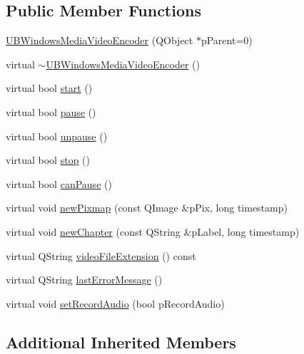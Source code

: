 \subsection*{Public Member Functions}
\begin{DoxyCompactItemize}
\item 
\hyperlink{class_u_b_windows_media_video_encoder_a6902002f07e574ef46f2e975cf75eac8}{U\-B\-Windows\-Media\-Video\-Encoder} (Q\-Object $\ast$p\-Parent=0)
\item 
virtual \hyperlink{class_u_b_windows_media_video_encoder_ad6213726d5404dbcfa03924a40ee7d8e}{$\sim$\-U\-B\-Windows\-Media\-Video\-Encoder} ()
\item 
virtual bool \hyperlink{class_u_b_windows_media_video_encoder_a88826be28b76bc7917daac0c8b077037}{start} ()
\item 
virtual bool \hyperlink{class_u_b_windows_media_video_encoder_a58feb0ad63b6e980b77e5a7cd9392f7c}{pause} ()
\item 
virtual bool \hyperlink{class_u_b_windows_media_video_encoder_ae4d2d6fbc01e62141279fd17f8f89e76}{unpause} ()
\item 
virtual bool \hyperlink{class_u_b_windows_media_video_encoder_a9f665f07f31a18c712653890abc7c6e6}{stop} ()
\item 
virtual bool \hyperlink{class_u_b_windows_media_video_encoder_a15d2ae84e27fc9156ae662ae05e1a316}{can\-Pause} ()
\item 
virtual void \hyperlink{class_u_b_windows_media_video_encoder_a064b4202443b041b2680c9082a70a384}{new\-Pixmap} (const Q\-Image \&p\-Pix, long timestamp)
\item 
virtual void \hyperlink{class_u_b_windows_media_video_encoder_ac5cf17870ab8834c45ae80155743daf7}{new\-Chapter} (const Q\-String \&p\-Label, long timestamp)
\item 
virtual Q\-String \hyperlink{class_u_b_windows_media_video_encoder_aa22fb19e4f464b9f8043191fbb57280a}{video\-File\-Extension} () const 
\item 
virtual Q\-String \hyperlink{class_u_b_windows_media_video_encoder_ac201751663b965622f2dedf468493a35}{last\-Error\-Message} ()
\item 
virtual void \hyperlink{class_u_b_windows_media_video_encoder_a8161cc1d5203e07de5bcf92b6b7e9acf}{set\-Record\-Audio} (bool p\-Record\-Audio)
\end{DoxyCompactItemize}
\subsection*{Additional Inherited Members}


